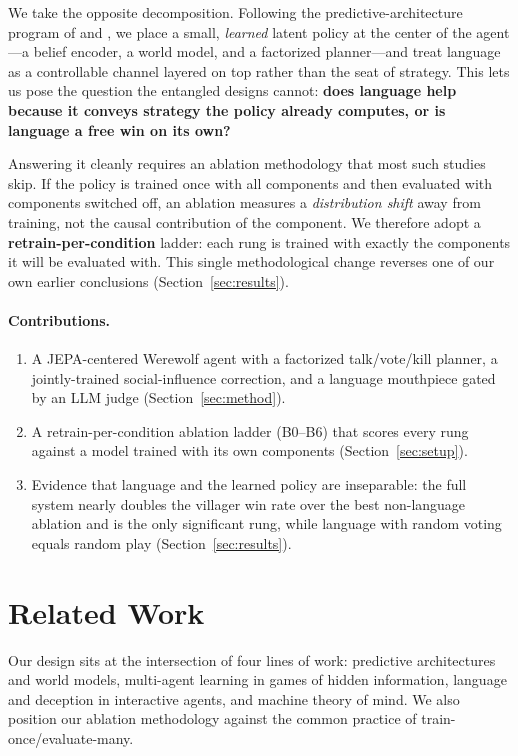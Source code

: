 \documentclass[11pt]{article}
\begin{document}
We take the opposite decomposition. Following the predictive-architecture program
of \citet{lecun2022path} and \citet{assran2023ijepa}, we place a small,
\emph{learned} latent policy at the center of the agent---a belief encoder, a
world model, and a factorized planner---and treat language as a controllable
channel layered on top rather than the seat of strategy. This lets us pose the
question the entangled designs cannot: \textbf{does language help because it
conveys strategy the policy already computes, or is language a free win on its
own?}

Answering it cleanly requires an ablation methodology that most such studies skip.
If the policy is trained once with all components and then evaluated with
components switched off, an ablation measures a \emph{distribution shift} away
from training, not the causal contribution of the component. We therefore adopt a
\textbf{retrain-per-condition} ladder: each rung is trained with exactly the
components it will be evaluated with. This single methodological change reverses
one of our own earlier conclusions (Section~\ref{sec:results}).

\paragraph{Contributions.}
\begin{enumerate}
  \item A JEPA-centered Werewolf agent with a factorized talk/vote/kill planner, a
        jointly-trained social-influence correction, and a language mouthpiece
        gated by an LLM judge (Section~\ref{sec:method}).
  \item A retrain-per-condition ablation ladder (B0--B6) that scores every rung
        against a model trained with its own components
        (Section~\ref{sec:setup}).
  \item Evidence that language and the learned policy are inseparable: the full
        system nearly doubles the villager win rate over the best non-language
        ablation and is the only significant rung, while language with random
        voting equals random play (Section~\ref{sec:results}).
\end{enumerate}

\section{Related Work}
Our design sits at the intersection of four lines of work: predictive
architectures and world models, multi-agent learning in games of hidden
information, language and deception in interactive agents, and machine theory of
mind. We also position our ablation methodology against the common practice of
train-once/evaluate-many.
\end{document}
